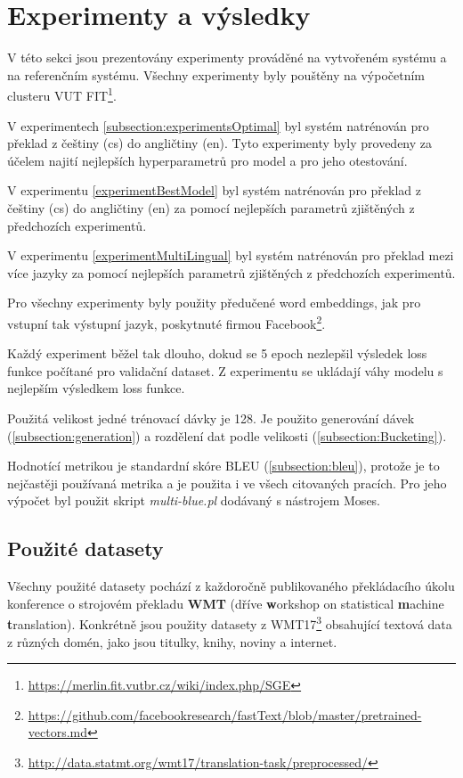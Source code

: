 \chapter{Experimenty a výsledky} \label{chapter:results}
V této sekci jsou prezentovány experimenty prováděné na vytvořeném systému a na referenčním systému. Všechny experimenty byly pouštěny na výpočetním clusteru VUT FIT\footnote{\url{https://merlin.fit.vutbr.cz/wiki/index.php/SGE}}.

V experimentech \ref{subsection:experimentsOptimal} byl systém natrénován pro překlad z češtiny (cs) do angličtiny (en). Tyto experimenty byly provedeny za účelem najití nejlepších hyperparametrů pro model a pro jeho otestování.

V experimentu \ref{experimentBestModel} byl systém natrénován pro překlad z češtiny (cs) do angličtiny (en) za pomocí nejlepších parametrů zjištěných z předchozích experimentů.

V experimentu \ref{experimentMultiLingual} byl systém natrénován pro překlad mezi více jazyky za pomocí nejlepších parametrů zjištěných z předchozích experimentů.

Pro všechny experimenty byly použity předučené word embeddings, jak pro vstupní tak výstupní jazyk, poskytnuté firmou Facebook\footnote{\url{https://github.com/facebookresearch/fastText/blob/master/pretrained-vectors.md}}.

Každý experiment běžel tak dlouho, dokud se 5 epoch nezlepšil výsledek loss funkce počítané pro validační dataset. Z experimentu se ukládají váhy modelu s nejlepším výsledkem loss funkce.

Použitá velikost jedné trénovací dávky je 128. Je použito generování dávek (\ref{subsection:generation}) a rozdělení dat podle velikosti (\ref{subsection:Bucketing}).

Hodnotící metrikou je standardní skóre BLEU (\ref{subsection:bleu}), protože je to nejčastěji používaná metrika a je použita i ve všech citovaných pracích. Pro jeho výpočet byl použit skript \emph{multi-blue.pl} dodávaný s nástrojem Moses.


\section{Použité datasety}
Všechny použité datasety pochází z každoročně publikovaného překládacího úkolu konference o strojovém překladu \textbf{WMT} (dříve \textbf{w}orkshop on statistical \textbf{m}achine \textbf{t}ranslation). Konkrétně jsou použity datasety z WMT17\footnote{\url{http://data.statmt.org/wmt17/translation-task/preprocessed/}} obsahující textová data z různých domén, jako jsou titulky, knihy, noviny a internet.

